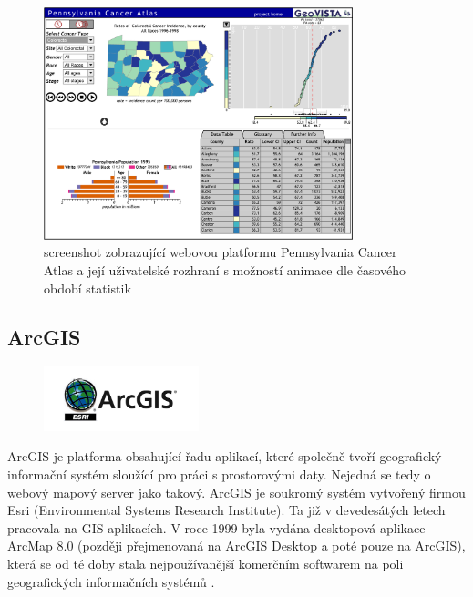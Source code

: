\begin{figure}[h!]  \centering
\includegraphics[width=0.8\textwidth]{../img/pennsylvania-cancer-atlas.png}
	\caption{screenshot zobrazující webovou platformu Pennsylvania
Cancer Atlas a její uživatelské rozhraní s možností animace dle
časového období statistik}
	\label{fig:gay-sands}
\end{figure}
 
\newpage
\subsection{ArcGIS}

\begin{figure}[h!]  \centering
\includegraphics[width=0.4\textwidth]{../img/arcgis-logo.jpg}
	\label{fig:arcgis-logo}
\end{figure} \bigskip

ArcGIS je platforma obsahující řadu aplikací, které společně tvoří
geografický informační systém sloužící pro práci s prostorovými
daty. Nejedná se tedy o webový mapový server jako takový. ArcGIS je
soukromý systém vytvořený firmou Esri (Environmental Systems Research
Institute). Ta již v devedesátých letech pracovala na GIS
aplikacích. V roce 1999 byla vydána desktopová aplikace ArcMap 8.0
(později přejmenovaná na ArcGIS Desktop a poté pouze na ArcGIS), která
se od té doby stala nejpoužívanější komerčním softwarem na poli
geografických informačních systémů \cite{arcgis_history}.

